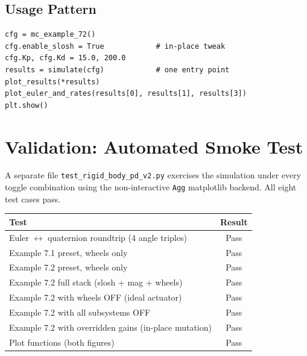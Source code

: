 \subsection{Usage Pattern}

\begin{lstlisting}
cfg = mc_example_72()
cfg.enable_slosh = True            # in-place tweak
cfg.Kp, cfg.Kd = 15.0, 200.0
results = simulate(cfg)            # one entry point
plot_results(*results)
plot_euler_and_rates(results[0], results[1], results[3])
plt.show()
\end{lstlisting}


\section{Validation: Automated Smoke Test}

A separate file \texttt{test\_rigid\_body\_pd\_v2.py} exercises the
simulation under every toggle combination using the non-interactive
\texttt{Agg} matplotlib backend. All eight test cases pass.

\begin{center}
\begin{tabular}{lc}
\toprule
\textbf{Test} & \textbf{Result} \\
\midrule
Euler $\leftrightarrow$ quaternion roundtrip (4 angle triples) & Pass \\
Example 7.1 preset, wheels only                                 & Pass \\
Example 7.2 preset, wheels only                                 & Pass \\
Example 7.2 full stack (slosh + mag + wheels)                   & Pass \\
Example 7.2 with wheels OFF (ideal actuator)                    & Pass \\
Example 7.2 with all subsystems OFF                             & Pass \\
Example 7.2 with overridden gains (in-place mutation)           & Pass \\
Plot functions (both figures)                                   & Pass \\
\bottomrule
\end{tabular}
\end{center}

